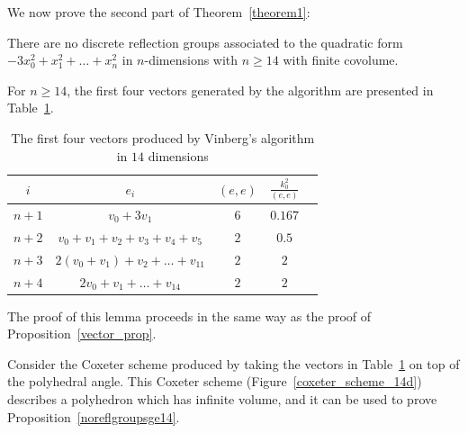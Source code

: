 \documentclass[smallcondensed]{svjour3}                     %
\begin{document}
We now prove the second part of Theorem~\ref{theorem1}:
\begin{proposition}\label{noreflgroupsge14}
There are no discrete reflection groups associated to the quadratic form $-3x_0^2 + x_1^2 + \ldots + x_n^2$ in $n$-dimensions with $n \ge 14$ with finite covolume.
\end{proposition}

\begin{lemma}
For  $n \ge 14$, the first four  vectors generated by the algorithm are presented in Table~\ref{14d_vectors}.
\begin{table}[h!]
\centering
\caption{\label{14d_vectors}The first four vectors produced by Vinberg's algorithm in $14$ dimensions}
  \begin{tabular}{c|c|c|c|c}
    $i$ & $e_i$ & $(e,e)$ & $\frac{k_0^2}{(e,e)}$\\
    \hline
    $n+1$ & $v_0 + 3 v_1$ & $6$ & $0.167$\\
    $n+2$ & $v_0 + v_1 + v_2 + v_3 + v_4 + v_5$ & $2$ & $0.5$\\
    $n+3$ & $2(v_0 + v_1) + v_2 + \ldots + v_{11}$ & $2$ & $2$\\
    $n+4$ & $2v_0 + v_1 + \ldots + v_{14}$ & $2$ & $2$
  \end{tabular}
\end{table}
\end{lemma}

The proof of this lemma proceeds in the same way as the proof of Proposition~\ref{vector_prop}.

Consider the Coxeter scheme produced by taking the vectors in Table~\ref{14d_vectors} on top of the polyhedral angle. This Coxeter scheme (Figure~\ref{coxeter_scheme_14d}) describes a polyhedron which has infinite volume, and it can be used to prove Proposition~\ref{noreflgroupsge14}.
\end{document}
